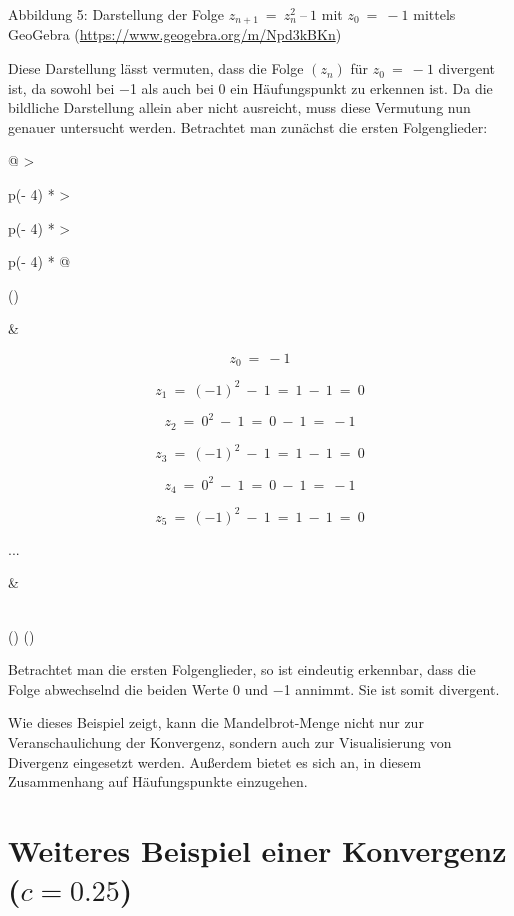 \documentclass[a4paper, 12pt]{book}
\begin{document}
\protect\hypertarget{_Toc167901655}{}{}Abbildung 5: Darstellung der
Folge \(z_{n + 1}\  = \ z_{n}^{2}\ –\ 1\) mit \(z_{0}\  = \  - 1\)
mittels GeoGebra (\url{https://www.geogebra.org/m/Npd3kBKn})

Diese Darstellung lässt vermuten, dass die Folge
\(\left( z_{n} \right)\) für \(z_{0}\  = \  - 1\) divergent ist, da
sowohl bei \(-\)1 als auch bei 0 ein Häufungspunkt zu erkennen ist. Da
die bildliche Darstellung allein aber nicht ausreicht, muss diese
Vermutung nun genauer untersucht werden. Betrachtet man zunächst die
ersten Folgenglieder:

\begin{longtable}[]{@{}
  >{\raggedright\arraybackslash}p{(\columnwidth - 4\tabcolsep) * }
  >{\raggedright\arraybackslash}p{(\columnwidth - 4\tabcolsep) * }
  >{\raggedright\arraybackslash}p{(\columnwidth - 4\tabcolsep) * }@{}}
\toprule()
\begin{minipage}[b]{\linewidth}\raggedright
\end{minipage} & \begin{minipage}[b]{\linewidth}\raggedright
\[z_{0}\  = \  - 1\]

\[z_{1}\  = \ ( - 1)^{2}\  - \ 1\  = \ 1\  - \ 1\  = \ 0\]

\[z_{2}\  = \ 0^{2}\  - \ 1\  = \ 0\  - \ 1\  = \  - 1\]

\[z_{3}\  = \ ( - 1)^{2}\  - \ 1\  = \ 1\  - \ 1\  = \ 0\]

\[z_{4}\  = \ 0^{2}\  - \ 1\  = \ 0\  - \ 1\  = \  - 1\]

\[z_{5}\  = \ ( - 1)^{2}\  - \ 1\  = \ 1\  - \ 1\  = \ 0\]

...
\end{minipage} & \begin{minipage}[b]{\linewidth}\raggedright
\end{minipage} \\
\midrule()
\endhead
\bottomrule()
\end{longtable}

Betrachtet man die ersten Folgenglieder, so ist eindeutig erkennbar,
dass die Folge abwechselnd die beiden Werte 0 und \(-\)1 annimmt. Sie
ist somit divergent.

Wie dieses Beispiel zeigt, kann die Mandelbrot-Menge nicht nur zur
Veranschaulichung der Konvergenz, sondern auch zur Visualisierung von
Divergenz eingesetzt werden. Außerdem bietet es sich an, in diesem
Zusammenhang auf Häufungspunkte einzugehen.

\section{Weiteres Beispiel einer Konvergenz ($c=0.25$)}
\end{document}

